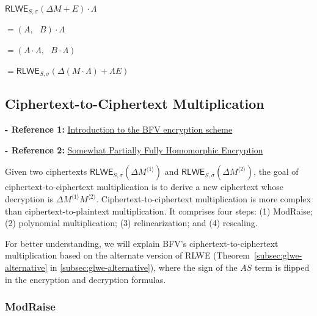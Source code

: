 \begin{tcolorbox}[title={\textbf{\tboxlabel{\ref*{subsec:bfv-mult-plain}} BFV Ciphertext-to-Plaintext Multiplication}}]
$\textsf{RLWE}_{S, \sigma}(\Delta M + E) \cdot \Lambda$

$= (A, \text{ } B) \cdot \Lambda$

$= (A \cdot \Lambda, \text{ }  B \cdot \Lambda )$

$= \textsf{RLWE}_{S, \sigma}(\Delta (M \cdot \Lambda) + \Lambda E)$
\end{tcolorbox}




\subsection{Ciphertext-to-Ciphertext Multiplication}
\label{subsec:bfv-mult-cipher}

\noindent \textbf{- Reference 1:} 
\href{https://www.inferati.com/blog/fhe-schemes-bfv}{Introduction to the BFV encryption scheme}~\cite{inferati-bfv}

\noindent \textbf{- Reference 2:} 
\href{https://eprint.iacr.org/2012/144.pdf}{Somewhat Partially Fully Homomorphic Encryption}~\cite{cryptoeprint:2012/144}



Given two ciphertexts $\textsf{RLWE}_{S, \sigma}(\Delta M^{\langle 1\rangle })$ and $\textsf{RLWE}_{S, \sigma}(\Delta M^{\langle 2\rangle})$, the goal of ciphertext-to-ciphertext multiplication is to derive a new ciphertext whose decryption is $\Delta M^{\langle 1 \rangle} M^{\langle 2 \rangle}$. Ciphertext-to-ciphertext multiplication is more complex than ciphertext-to-plaintext multiplication. It comprises four steps: (1) \textsf{ModRaise}; (2) polynomial multiplication; (3) relinearization; and (4) rescaling. 

For better understanding, we will explain BFV's ciphertext-to-ciphertext multiplication based on the alternate version of RLWE (Theorem~\ref*{subsec:glwe-alternative} in \autoref{subsec:glwe-alternative}), where the sign of the $AS$ term is flipped in the encryption and decryption formulas.

\subsubsection{\textsf{ModRaise}}
\label{subsubsec:bfv-mult-cipher-modraise}

